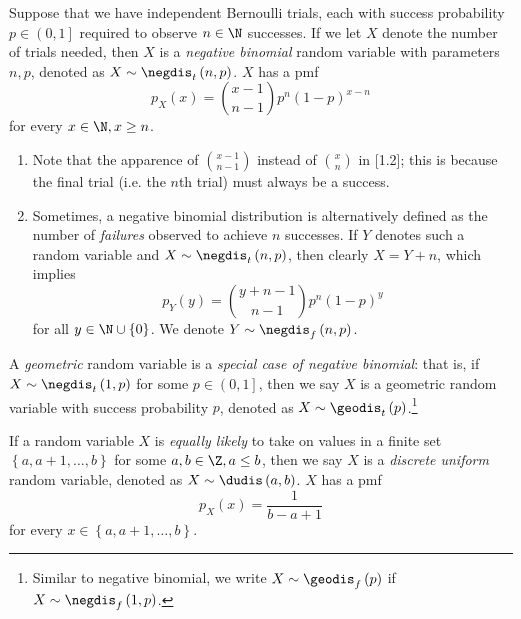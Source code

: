 \documentclass[stat333]{subfiles}
\begin{document}
    Suppose that we have independent Bernoulli trials, each with success probability $p\in\left( 0,1 \right]$ required to observe $n\in\N$ successes. If we let $X$ denote the number of trials needed, then $X$ is a \emph{negative binomial} random variable with parameters $n,p$, denoted as $X\sim\negdis_t\left( n,p \right)$. $X$ has a pmf
    \begin{equation}
        p_X\left( x \right) = \binom{x-1}{n-1}p^n\left( 1-p \right) ^{x-n} 
    \end{equation}
    for every $x\in\N, x\geq n$.
    \begin{enumerate}
        \item Note that the apparence of $\binom{x-1}{n-1}$ instead of $\binom{x}{n}$ in [1.2]; this is because the final trial (i.e. the $n$th trial) must always be a success.
        \item Sometimes, a negative binomial distribution is alternatively defined as the number of \textit{failures} observed to achieve $n$ successes. If $Y$ denotes such a random variable and $X\sim\negdis_t\left( n,p \right)$, then clearly $X=Y+n$, which implies
            \begin{equation*}
                p_Y\left( y \right) = \binom{y+n-1}{n-1}p^n\left( 1-p \right) ^y
            \end{equation*}
            for all $y\in\N\cup\left\lbrace 0 \right\rbrace$. We denote $Y\sim\negdis_f\left( n,p \right)$.
    \end{enumerate}

    \np[Geometric]A \emph{geometric} random variable is a \textit{special case of negative binomial}: that is, if $X\sim\negdis_t\left( 1,p \right)$ for some $p\in\left( 0,1 \right]$, then we say $X$ is a geometric random variable with success probability $p$, denoted as $X\sim\geodis_t\left( p \right)$.\footnote{Similar to negative binomial, we write $X\sim\geodis_f\left( p \right)$ if $X\sim\negdis_f\left( 1,p \right)$.}

    If a random variable $X$ is \textit{equally likely} to take on values in a finite set $\left\lbrace a,a+1,\ldots,b \right\rbrace$ for some $a,b\in\Z, a\leq b$, then we say $X$ is a \emph{discrete uniform} random variable, denoted as $X\sim\dudis\left( a,b \right)$. $X$ has a pmf
    \begin{equation*}
        p_X\left( x \right) = \frac{1}{b-a+1}
    \end{equation*}
    for every $x\in \left\lbrace a,a+1,\ldots,b \right\rbrace$.
\end{document}
